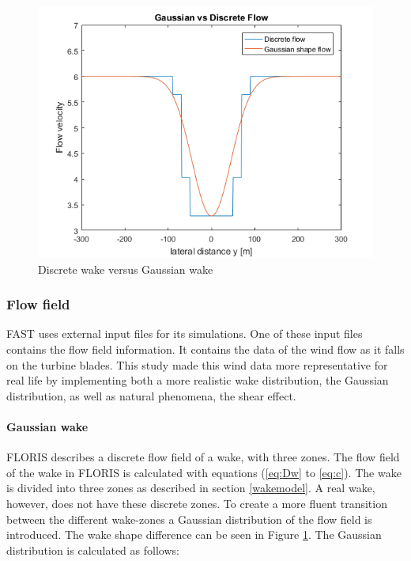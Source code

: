 \begin{figure}
  \includegraphics[width=\linewidth]{./Figures/PlotGausDiscWakeDWake180U6yaw0.png} %
  \caption{Discrete wake versus Gaussian wake} %
  \label{fig:disgaus}
\end{figure}


\subsubsection{Flow field}
FAST uses external input files for its simulations. One of these input files contains the flow field information. It contains the data of the wind flow as it falls on the turbine blades. This study made this wind data more representative for real life by implementing both a more realistic wake distribution, the Gaussian distribution, as well as natural phenomena, the shear effect.

\paragraph{Gaussian wake}
FLORIS describes a discrete flow field of a wake, with three zones. The flow field of the wake in FLORIS is calculated with equations (\ref{eq:Dw} to \ref{eq:c}). The wake is divided into three zones as described in section \ref{wakemodel}. A real wake, however, does not have these discrete zones. To create a more fluent transition between the different wake-zones a Gaussian distribution of the flow field is introduced\cite{Bastankhah2016}. The wake shape difference can be seen in Figure \ref{fig:disgaus}.  The Gaussian distribution is calculated as follows: 

